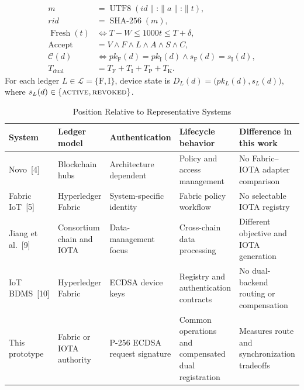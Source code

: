
\newcommand{\ledgerSet}{\mathcal{L}=\{\mathrm{F},\mathrm{I}\}}
\begin{align}
m &= \operatorname{UTF8}\!\left(
  \mathit{id}\parallel\texttt{:}\parallel a\parallel\texttt{:}\parallel t
\right), \label{eq:request-message}\\
\mathit{rid} &= \operatorname{SHA\text{-}256}(m), \label{eq:replay-id}\\
\operatorname{Fresh}(t) &\Longleftrightarrow
  T-W \le 1000t \le T+\delta, \label{eq:freshness}\\
\operatorname{Accept} &= V\land F\land L\land A\land S\land C, \label{eq:accept}\\
\mathcal{C}(d) &\Longleftrightarrow
  pk_{\mathrm{F}}(d)=pk_{\mathrm{I}}(d)
  \land s_{\mathrm{F}}(d)=s_{\mathrm{I}}(d), \label{eq:agreement}\\
T_{\mathrm{dual}} &= T_{\mathrm{F}}+T_{\mathrm{I}}+T_{\mathrm{P}}+T_{\mathrm{K}}.
\label{eq:dual-latency}
\end{align}
For each ledger $L\in\ledgerSet$, device state is
$D_L(d)=\bigl(pk_L(d),s_L(d)\bigr)$, where
$s_L(d)\in\{\textsc{active},\textsc{revoked}\}$.

\begin{table}[t]
\caption{Position Relative to Representative Systems}
\label{tab:related-work}
\centering
\footnotesize
\begin{tabularx}{\textwidth}{@{}l l l X X@{}}
\toprule
System & Ledger model & Authentication & Lifecycle behavior & Difference in this work \\
\midrule
Novo~[4] & Blockchain hubs & Architecture dependent & Policy and access management & No Fabric--IOTA adapter comparison \\
Fabric IoT~[5] & Hyperledger Fabric & System-specific identity & Fabric policy workflow & No selectable IOTA registry \\
Jiang et al.~[9] & Consortium chain and IOTA & Data-management focus & Cross-chain data processing & Different objective and IOTA generation \\
IoT BDMS~[10] & Hyperledger Fabric & ECDSA device keys & Registry and authentication contracts & No dual-backend routing or compensation \\
This prototype & Fabric or IOTA authority & P-256 ECDSA request signature & Common operations and compensated dual registration & Measures route and synchronization tradeoffs \\
\bottomrule
\end{tabularx}
\end{table}

